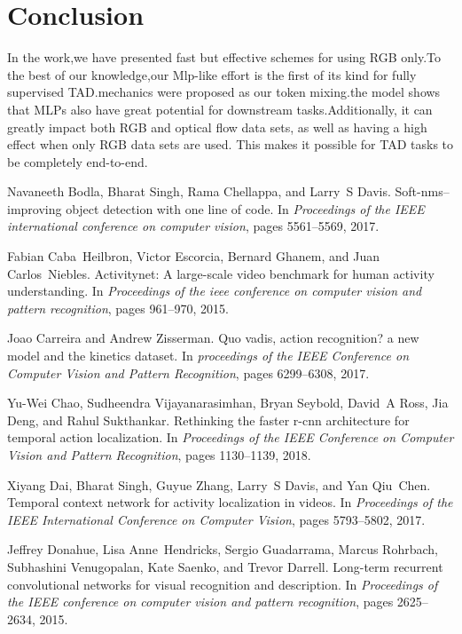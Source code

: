 \documentclass[10pt,twocolumn,letterpaper]{article}
\begin{document}
\section{Conclusion}
In the work,we have presented fast but effective schemes for using RGB only.To the best of our knowledge,our Mlp-like effort is the first of its kind for fully supervised TAD.mechanics were proposed as our token mixing.the model shows that MLPs also have great potential for downstream tasks.Additionally, it can greatly impact both RGB and optical flow data sets, as well as having a high effect when only RGB data sets are used. This makes it possible for TAD tasks to be completely end-to-end.

{\small
\begin{thebibliography}{10}\itemsep=-1pt

Navaneeth Bodla, Bharat Singh, Rama Chellappa, and Larry~S Davis.
\newblock Soft-nms--improving object detection with one line of code.
\newblock In {\em Proceedings of the IEEE international conference on computer
  vision}, pages 5561--5569, 2017.

Fabian Caba~Heilbron, Victor Escorcia, Bernard Ghanem, and Juan Carlos~Niebles.
\newblock Activitynet: A large-scale video benchmark for human activity
  understanding.
\newblock In {\em Proceedings of the ieee conference on computer vision and
  pattern recognition}, pages 961--970, 2015.

Joao Carreira and Andrew Zisserman.
\newblock Quo vadis, action recognition? a new model and the kinetics dataset.
\newblock In {\em proceedings of the IEEE Conference on Computer Vision and
  Pattern Recognition}, pages 6299--6308, 2017.

Yu-Wei Chao, Sudheendra Vijayanarasimhan, Bryan Seybold, David~A Ross, Jia
  Deng, and Rahul Sukthankar.
\newblock Rethinking the faster r-cnn architecture for temporal action
  localization.
\newblock In {\em Proceedings of the IEEE Conference on Computer Vision and
  Pattern Recognition}, pages 1130--1139, 2018.

Xiyang Dai, Bharat Singh, Guyue Zhang, Larry~S Davis, and Yan Qiu~Chen.
\newblock Temporal context network for activity localization in videos.
\newblock In {\em Proceedings of the IEEE International Conference on Computer
  Vision}, pages 5793--5802, 2017.

Jeffrey Donahue, Lisa Anne~Hendricks, Sergio Guadarrama, Marcus Rohrbach,
  Subhashini Venugopalan, Kate Saenko, and Trevor Darrell.
\newblock Long-term recurrent convolutional networks for visual recognition and
  description.
\newblock In {\em Proceedings of the IEEE conference on computer vision and
  pattern recognition}, pages 2625--2634, 2015.


\end{thebibliography}}
\end{document}
